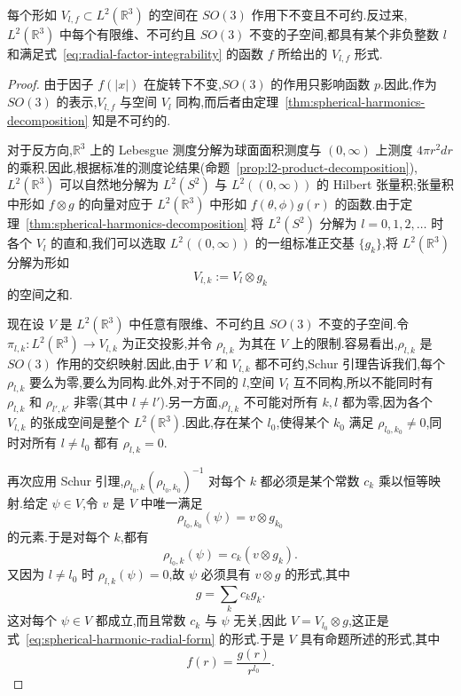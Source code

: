 \begin{proposition}\label{prop:radial-representation-classification}
每个形如 $V_{l,f}\subset L^2(\mathbb R^3)$ 的空间在 $SO(3)$ 作用下不变且不可约.反过来,$L^2(\mathbb R^3)$ 中每个有限维、不可约且 $SO(3)$ 不变的子空间,都具有某个非负整数 $l$ 和满足式~\eqref{eq:radial-factor-integrability} 的函数 $f$ 所给出的 $V_{l,f}$ 形式.
\end{proposition}

\begin{proof}
由于因子 $f(|x|)$ 在旋转下不变,$SO(3)$ 的作用只影响函数 $p$.因此,作为 $SO(3)$ 的表示,$V_{l,f}$ 与空间 $V_l$ 同构,而后者由定理~\ref{thm:spherical-harmonics-decomposition} 知是不可约的.

对于反方向,$\mathbb R^3$ 上的 Lebesgue 测度分解为球面面积测度与 $(0,\infty)$ 上测度 $4\pi r^2dr$ 的乘积.因此,根据标准的测度论结果(命题~\ref{prop:l2-product-decomposition}),$L^2(\mathbb R^3)$ 可以自然地分解为 $L^2(S^2)$ 与 $L^2((0,\infty))$ 的 Hilbert 张量积;张量积中形如 $f\otimes g$ 的向量对应于 $L^2(\mathbb R^3)$ 中形如 $f(\theta,\phi)g(r)$ 的函数.由于定理~\ref{thm:spherical-harmonics-decomposition} 将 $L^2(S^2)$ 分解为 $l=0,1,2,\ldots$ 时各个 $V_l$ 的直和,我们可以选取 $L^2((0,\infty))$ 的一组标准正交基 $\{g_k\}$,将 $L^2(\mathbb R^3)$ 分解为形如
\[
 V_{l,k}:=V_l\otimes g_k
\]
的空间之和.

现在设 $V$ 是 $L^2(\mathbb R^3)$ 中任意有限维、不可约且 $SO(3)$ 不变的子空间.令 $\pi_{l,k}:L^2(\mathbb R^3)\to V_{l,k}$ 为正交投影,并令 $\rho_{l,k}$ 为其在 $V$ 上的限制.容易看出,$\rho_{l,k}$ 是 $SO(3)$ 作用的交织映射.因此,由于 $V$ 和 $V_{l,k}$ 都不可约,Schur 引理告诉我们,每个 $\rho_{l,k}$ 要么为零,要么为同构.此外,对于不同的 $l$,空间 $V_l$ 互不同构,所以不能同时有 $\rho_{l,k}$ 和 $\rho_{l',k'}$ 非零(其中 $l\neq l'$).另一方面,$\rho_{l,k}$ 不可能对所有 $k,l$ 都为零,因为各个 $V_{l,k}$ 的张成空间是整个 $L^2(\mathbb R^3)$.因此,存在某个 $l_0$,使得某个 $k_0$ 满足 $\rho_{l_0,k_0}\neq0$,同时对所有 $l\neq l_0$ 都有 $\rho_{l,k}=0$.

再次应用 Schur 引理,$\rho_{l_0,k}(\rho_{l_0,k_0})^{-1}$ 对每个 $k$ 都必须是某个常数 $c_k$ 乘以恒等映射.给定 $\psi\in V$,令 $v$ 是 $V$ 中唯一满足
\[
 \rho_{l_0,k_0}(\psi)=v\otimes g_{k_0}
\]
的元素.于是对每个 $k$,都有
\[
 \rho_{l_0,k}(\psi)=c_k(v\otimes g_k).
\]
又因为 $l\neq l_0$ 时 $\rho_{l,k}(\psi)=0$,故 $\psi$ 必须具有 $v\otimes g$ 的形式,其中
\[
 g=\sum_k c_kg_k.
\]
这对每个 $\psi\in V$ 都成立,而且常数 $c_k$ 与 $\psi$ 无关,因此 $V=V_{l_0}\otimes g$,这正是式~\eqref{eq:spherical-harmonic-radial-form} 的形式.于是 $V$ 具有命题所述的形式,其中
\[
 f(r)=\frac{g(r)}{r^{l_0}}.
\]
\end{proof}

